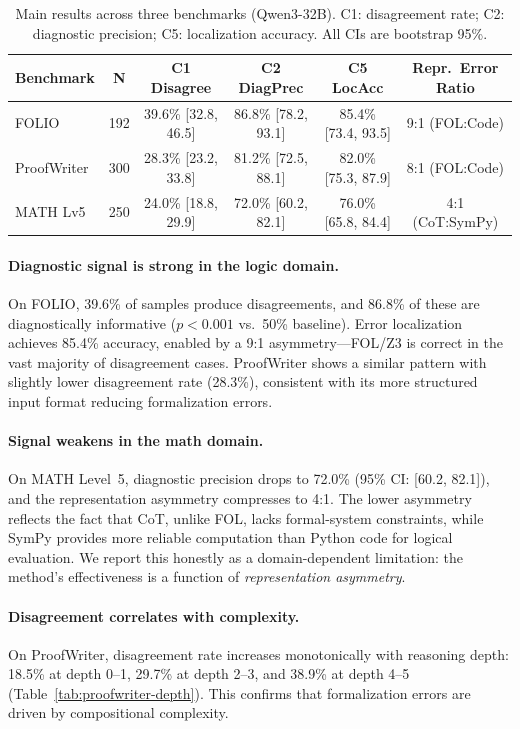 \documentclass[11pt,a4paper]{article}
\begin{document}
\begin{table}[t]
\centering
\small
\caption{Main results across three benchmarks (Qwen3-32B). C1: disagreement rate; C2: diagnostic precision; C5: localization accuracy. All CIs are bootstrap 95\%.}
\label{tab:main}
\begin{tabular}{lccccc}
\toprule
\textbf{Benchmark} & \textbf{N} & \textbf{C1 Disagree} & \textbf{C2 DiagPrec} & \textbf{C5 LocAcc} & \textbf{Repr.\ Error Ratio} \\
\midrule
FOLIO & 192 & 39.6\% [32.8, 46.5] & 86.8\% [78.2, 93.1] & 85.4\% [73.4, 93.5] & 9:1 (FOL:Code) \\
ProofWriter & 300 & 28.3\% [23.2, 33.8] & 81.2\% [72.5, 88.1] & 82.0\% [75.3, 87.9] & 8:1 (FOL:Code) \\
MATH Lv5 & 250 & 24.0\% [18.8, 29.9] & 72.0\% [60.2, 82.1] & 76.0\% [65.8, 84.4] & 4:1 (CoT:SymPy) \\
\bottomrule
\end{tabular}
\end{table}

\paragraph{Diagnostic signal is strong in the logic domain.} On FOLIO, 39.6\% of samples produce disagreements, and 86.8\% of these are diagnostically informative ($p < 0.001$ vs.\ 50\% baseline). Error localization achieves 85.4\% accuracy, enabled by a 9:1 asymmetry---FOL/Z3 is correct in the vast majority of disagreement cases. ProofWriter shows a similar pattern with slightly lower disagreement rate (28.3\%), consistent with its more structured input format reducing formalization errors.

\paragraph{Signal weakens in the math domain.} On MATH Level~5, diagnostic precision drops to 72.0\% (95\% CI: [60.2, 82.1]), and the representation asymmetry compresses to 4:1. The lower asymmetry reflects the fact that CoT, unlike FOL, lacks formal-system constraints, while SymPy provides more reliable computation than Python code for logical evaluation. We report this honestly as a domain-dependent limitation: the method's effectiveness is a function of \emph{representation asymmetry}.

\paragraph{Disagreement correlates with complexity.} On ProofWriter, disagreement rate increases monotonically with reasoning depth: 18.5\% at depth 0--1, 29.7\% at depth 2--3, and 38.9\% at depth 4--5 (Table~\ref{tab:proofwriter-depth}). This confirms that formalization errors are driven by compositional complexity.
\end{document}
